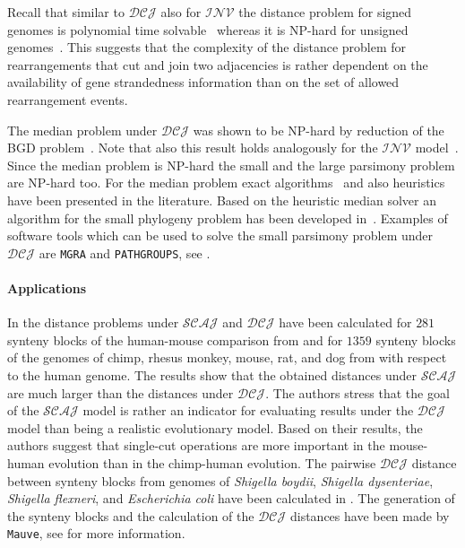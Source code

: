 \documentclass{svmult}
\newcommand{\m}[1]{\mathcal{#1}}
\begin{document}
Recall that similar to $\m{DCJ}$ also for $\m{INV}$ the distance problem for signed genomes is 
polynomial time solvable~\cite{Hannenhalli_1999} whereas it is NP-hard for unsigned genomes~\cite{Caprara_1997}. 
This suggests that the complexity of the distance problem for rearrangements that cut and join two adjacencies is 
rather dependent on the availability of gene strandedness information than on the set of allowed rearrangement events.

The median problem under $\m{DCJ}$ was shown to be NP-hard by reduction of 
the BGD problem~\cite{Tannier_2009}. Note that also this result holds analogously for the $\m{INV}$ model~\cite{Caprara_2003}. 
Since the median problem is NP-hard the small and the large parsimony problem are NP-hard too. 
For the median problem exact algorithms~\cite{Xu_2008,Zhang_2009} and also heuristics~\cite{Adam_2008,Lenne_2008} have been 
presented in the literature. 
Based on the heuristic median solver an algorithm for the small phylogeny problem has been developed in~\cite{Adam_2008}.
Examples of software tools which can be used to solve the small parsimony
problem under $\m{DCJ}$ are \texttt{MGRA} and \texttt{PATHGROUPS}, see
.

\paragraph{Applications}
In \cite{Bergeron_2010} the distance problems under $\m{SCAJ}$ and
$\m{DCJ}$ have been calculated for $281$ synteny blocks of the human-mouse
comparison from \cite{Pevzner_2003} and for $1359$ synteny blocks of the genomes
of chimp, rhesus monkey, mouse, rat, and dog from \cite{Ma_2006} with respect to
the human genome. 
The results show that the obtained distances under $\m{SCAJ}$ are much
larger than the distances under $\m{DCJ}$. The authors stress that the goal of  
the $\m{SCAJ}$ model is rather an indicator for evaluating results under 
the $\m{DCJ}$ model than being a realistic evolutionary model. 
Based on their results, the authors suggest that
single-cut operations are more important in the mouse-human evolution than in 
the chimp-human evolution.
The pairwise $\m{DCJ}$ distance between synteny blocks from genomes of
\emph{Shigella boydii}, \emph{Shigella dysenteriae}, \emph{Shigella flexneri}, 
and \emph{Escherichia coli} have been calculated in \cite{Friedberg_2008}. The generation of the synteny blocks and the calculation
of the $\m{DCJ}$ distances have been made by \texttt{Mauve}, see
 for more information.
 
\end{document}
